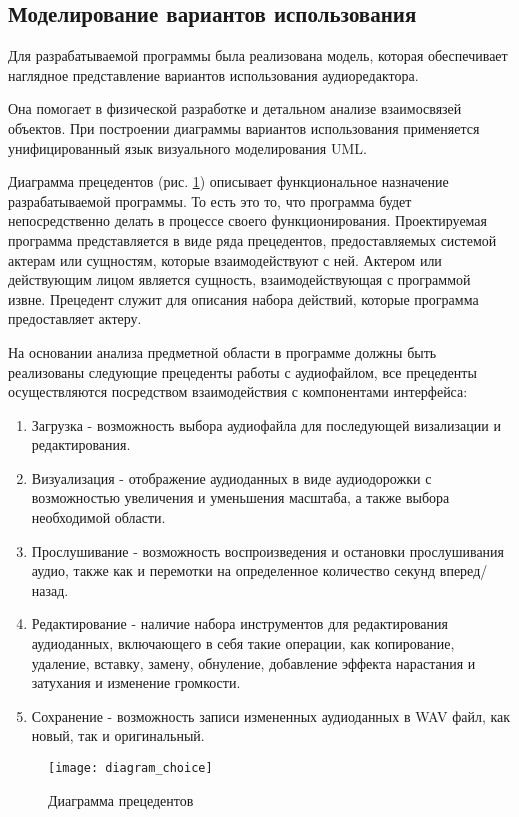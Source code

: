 \subsection{Моделирование вариантов использования}

Для разрабатываемой программы была реализована модель, которая обеспечивает наглядное представление вариантов использования аудиоредактора.

Она помогает в физической разработке и детальном анализе взаимосвязей объектов. При построении диаграммы вариантов использования применяется унифицированный язык визуального моделирования UML.

Диаграмма прецедентов (рис. \ref{diagram_choice:image}) описывает функциональное назначение разрабатываемой программы. То есть это то, что программа будет непосредственно делать в процессе своего функционирования. Проектируемая программа представляется в виде ряда прецедентов, предоставляемых системой актерам или сущностям, которые взаимодействуют с ней. Актером или действующим лицом является сущность, взаимодействующая с программой извне. Прецедент служит для описания набора действий, которые программа предоставляет актеру. 

На основании анализа предметной области в программе должны быть реализованы следующие прецеденты работы с аудиофайлом, все прецеденты осуществляются посредством взаимодействия с компонентами интерфейса:
\begin{enumerate}
\item Загрузка - возможность выбора аудиофайла для последующей визализации и редактирования.
\item Визуализация - отображение аудиоданных в виде аудиодорожки с возможностью увеличения и уменьшения масштаба, а также выбора необходимой области.
\item Прослушивание - возможность воспроизведения и остановки прослушивания аудио, также как и перемотки на определенное количество секунд вперед/назад.
\item Редактирование - наличие набора инструментов для редактирования аудиоданных, включающего в себя такие операции, как копирование, удаление, вставку, замену, обнуление, добавление эффекта нарастания и затухания и изменение громкости.
\item Сохранение - возможность записи измененных аудиоданных в WAV файл, как новый, так и оригинальный.
\end{enumerate}

\begin{figure}[ht]
	\texttt{[image: diagram\_choice]}
	\caption{Диаграмма прецедентов}
	\label{diagram_choice:image}
\end{figure}

